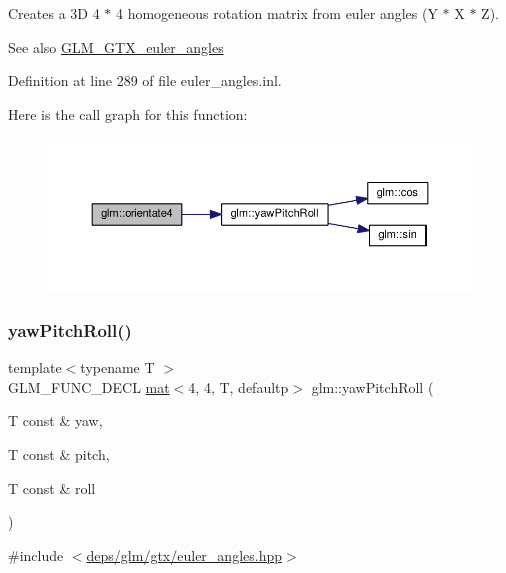Creates a 3D 4 $\ast$ 4 homogeneous rotation matrix from euler angles (Y $\ast$ X $\ast$ Z). \begin{DoxySeeAlso}{See also}
\hyperlink{group__gtx__euler__angles}{G\+L\+M\+\_\+\+G\+T\+X\+\_\+euler\+\_\+angles} 
\end{DoxySeeAlso}


Definition at line 289 of file euler\+\_\+angles.\+inl.

Here is the call graph for this function\+:
\nopagebreak
\begin{figure}[H]
\begin{center}
\leavevmode
\includegraphics[width=350pt]{d2/d7e/group__gtx__euler__angles_ga4a044653f71a4ecec68e0b623382b48a_cgraph}
\end{center}
\end{figure}
\mbox{\label{group__gtx__euler__angles_gae6aa26ccb020d281b449619e419a609e}} 
\subsubsection{\texorpdfstring{yaw\+Pitch\+Roll()}{yawPitchRoll()}}
{\footnotesize\ttfamily template$<$typename T $>$ \\
G\+L\+M\+\_\+\+F\+U\+N\+C\+\_\+\+D\+E\+CL \hyperlink{structglm_1_1mat}{mat}$<$4, 4, T, defaultp$>$ glm\+::yaw\+Pitch\+Roll (\begin{DoxyParamCaption}\item[{T const \&}]{yaw,  }\item[{T const \&}]{pitch,  }\item[{T const \&}]{roll }\end{DoxyParamCaption})}



{\ttfamily \#include $<$\hyperlink{euler__angles_8hpp}{deps/glm/gtx/euler\+\_\+angles.\+hpp}$>$}

